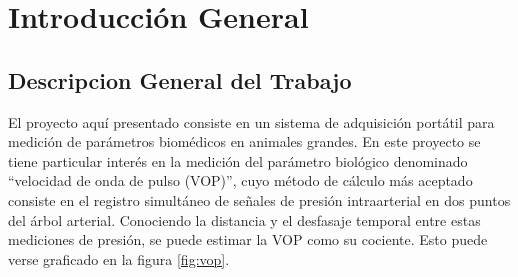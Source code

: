 
\chapter{Introducción General} %

\label{Chapter1} %
\label{IntroGeneral}


\newcommand{\keyword}[1]{\textbf{#1}}
\newcommand{\tabhead}[1]{\textbf{#1}}
\newcommand{\code}[1]{\texttt{#1}}
\newcommand{\file}[1]{\texttt{\bfseries#1}}
\newcommand{\option}[1]{\texttt{\itshape#1}}
\newcommand{\grados}{$^{\circ}$}



\section{Descripcion General del Trabajo}

El proyecto aquí presentado consiste en un sistema de adquisición portátil para medición de parámetros biomédicos en animales grandes. En este proyecto se tiene particular interés en la medición del parámetro biológico denominado \enquote{velocidad de onda de pulso (VOP)}, cuyo método de cálculo más aceptado consiste en el registro simultáneo de señales de presión intraarterial en dos puntos del árbol arterial. Conociendo la distancia y el desfasaje temporal entre estas mediciones de presión, se puede estimar la VOP como su cociente. Esto puede verse graficado en la figura \ref{fig:vop}.

